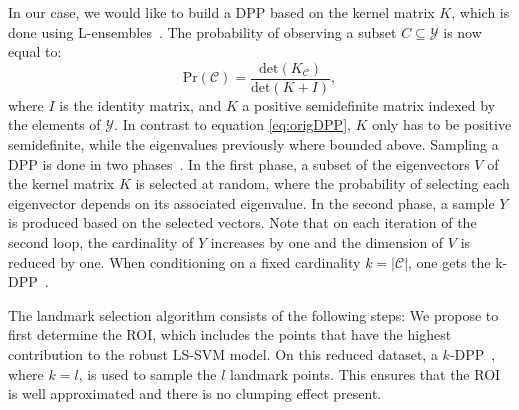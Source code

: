 \documentclass[preprint,12pt]{elsarticle}
\newtheorem*{remark}{Remark}
\begin{document}
	In our case, we would like to build a DPP based on the kernel matrix $K$, which is done using L-ensembles~\cite{kulesza2012determinantal}. The probability of observing a subset $C \subseteq \mathcal{Y}$ is now equal to:
	\begin{equation}
	\mathrm{Pr}(\mathcal{C}) = \frac{\mathrm{det}(K_{\mathcal{C}})}{\mathrm{det}(K + I)},
	\end{equation}
	where $I$ is the identity matrix, and $K$ a positive semidefinite matrix  indexed by the elements of $\mathcal{Y}$. In contrast to equation \eqref{eq:origDPP}, $K$ only has to be positive semidefinite, while the eigenvalues previously where bounded above. Sampling a DPP is done in two phases~\cite{kulesza2012determinantal}. In the first phase, a subset of the eigenvectors $V$ of the kernel matrix $K$ is selected at random, where the probability of selecting each eigenvector depends on its associated eigenvalue. In the second phase, a sample $Y$ is produced based on the selected vectors. Note that on each iteration of the second loop, the cardinality of $Y$ increases by one and the dimension of $ V$ is reduced by one. When conditioning on a fixed cardinality $k = |\mathcal{C}|$, one gets the k-DPP~\cite{kulesza2011k}. 	
	
	The landmark selection algorithm consists of the following steps:
	We propose to first determine the ROI, which includes the points that have the highest contribution to the robust LS-SVM model. On this reduced dataset, a $k$-DPP~\cite{kulesza2011k}, where $k = l$, is used to sample the $l$ landmark points. This ensures that the ROI is well approximated and there is no clumping effect present. 
%	
	
\end{document}

